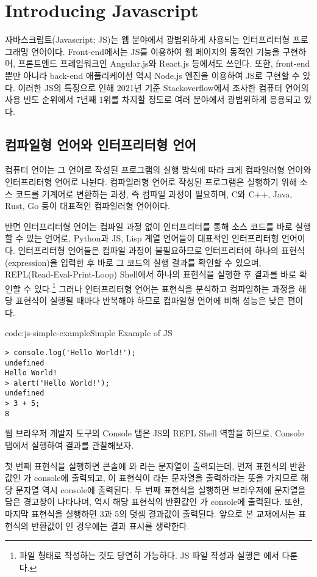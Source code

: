 \section{Introducing Javascript} \label{sect:introducing-javascript}

자바스크립트(Javascript; JS)는 웹 분야에서 광범위하게 사용되는 인터프리터형 프로그래밍 언어이다. Front-end에서는 JS를 이용하여 웹 페이지의 동적인 기능을 구현하며, 프론트엔드 프레임워크인 Angular.js와 React.js 등에서도 쓰인다. 또한, front-end 뿐만 아니라 back-end 애플리케이션 역시 Node.js 엔진을 이용하여 JS로 구현할 수 있다. 이러한 JS의 특징으로 인해 2021년 기준 Stackoverflow에서 조사한 컴퓨터 언어의 사용 빈도 순위에서 7년째 1위를 차지할 정도로 여러 분야에서 광범위하게 응용되고 있다.

\subsection*{컴파일형 언어와 인터프리터형 언어}

컴퓨터 언어는 그 언어로 작성된 프로그램의 실행 방식에 따라 크게 컴파일러형 언어와 인터프리터형 언어로 나뉜다. 컴파일러형 언어로 작성된 프로그램은 실행하기 위해 소스 코드를 기계어로 변환하는 과정, 즉 컴파일 과정이 필요하며, C와 C++, Java, Rust, Go 등이 대표적인 컴파일러형 언어이다.

반면 인터프리터형 언어는 컴파일 과정 없이 인터프리터를 통해 소스 코드를 바로 실행할 수 있는 언어로, Python과 JS, Lisp 계열 언어들이 대표적인 인터프리터형 언어이다. 인터프리터형 언어들은 컴파일 과정이 불필요하므로 인터프리터에 하나의 표현식(expression)을 입력한 후 바로 그 코드의 실행 결과를 확인할 수 있으며, REPL(Read-Eval-Print-Loop) Shell에서 하나의 표현식을 실행한 후 결과를 바로 확인할 수 있다.\footnote{파일 형태로 작성하는 것도 당연히 가능하다. JS 파일 작성과 실행은 에서 다룬다.} 그러나 인터프리터형 언어는 표현식을 분석하고 컴파일하는 과정을 해당 표현식이 실행될 때마다 반복해야 하므로 컴파일형 언어에 비해 성능은 낮은 편이다.

\begin{codeenv}{code:js-simple-example}{Simple Example of JS}\begin{verbatim}
> console.log('Hello World!');
undefined
Hello World!
> alert('Hello World!');
undefined
> 3 + 5;
8
\end{verbatim}
\end{codeenv}

웹 브라우저 개발자 도구의 Console 탭은 JS의 REPL Shell 역할을 하므로, Console 탭에서 \을 실행하여 결과를 관찰해보자.

첫 번째 표현식을 실행하면 콘솔에 와 라는 문자열이 출력되는데, 먼저 표현식의 반환값인 가 console에 출력되고, 이 표현식이 라는 문자열을 출력하라는 뜻을 가지므로 해당 문자열 역시 console에 출력된다. 두 번째 표현식을 실행하면 브라우저에  문자열을 담은 경고창이 나타나며, 역시 해당 표현식의 반환값인 가 console에 출력된다. 또한, 마지막 표현식을 실행하면 3과 5의 덧셈 결과값이 출력된다. 앞으로 본 교재에서는 표현식의 반환값이 인 경우에는 결과 표시를 생략한다.
